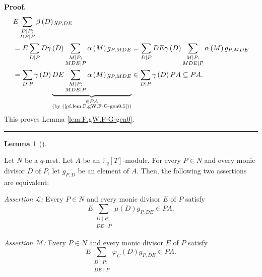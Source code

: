 \documentclass[numbers=enddot,12pt,final,onecolumn,notitlepage]{scrartcl}%
\theoremstyle{definition}
\newtheorem{lem}[theo]{Lemma}
\newenvironment{lemma}[1][]
{\begin{lem}[#1]\begin{leftbar}}
{\end{leftbar}\end{lem}}
\newenvironment{proof}[1][Proof]{\noindent\textbf{#1.} }{\ \rule{0.5em}{0.5em}}
\let\sumnonlimits\sum
\renewcommand{\sum}{\sumnonlimits\limits}
\begin{document}
\begin{proof}
\begin{align*}
&  E\sum_{\substack{D\mid P;\\DE\mid P}}\beta\left(  D\right)  g_{P,DE}\\
&  =E\sum_{D\mid P}D\gamma\left(  D\right)  \sum_{\substack{M\mid P;\\MDE\mid
P}}\alpha\left(  M\right)  g_{P,MDE}=\sum_{D\mid P}DE\gamma\left(  D\right)
\sum_{\substack{M\mid P;\\MDE\mid P}}\alpha\left(  M\right)  g_{P,MDE}\\
&  =\sum_{D\mid P}\gamma\left(  D\right)  \underbrace{DE\sum_{\substack{M\mid
P;\\MDE\mid P}}\alpha\left(  M\right)  g_{P,MDE}}_{\substack{\in PA\\\text{(by
(\ref{pf.lem.F.gW.F-G-gen0.5}))}}}\in\sum_{D\mid P}\gamma\left(  D\right)
PA\subseteq PA.
\end{align*}
This proves Lemma \ref{lem.F.gW.F-G-gen0}.
\end{proof}

\begin{lemma}
\label{lem.F.gW.F-G-gen}Let $N$ be a $q$-nest. Let $A$ be an $\mathbb{F}%
_{q}\left[  T\right]  $-module. For every $P\in N$ and every monic divisor $D$
of $P$, let $g_{P,D}$ be an element of $A$. Then, the following two assertions
are equivalent:

\textit{Assertion }$\mathcal{L}$\textit{:} Every $P\in N$ and every monic
divisor $E$ of $P$ satisfy%
\[
E\sum_{\substack{D\mid P;\\DE\mid P}}\mu\left(  D\right)  g_{P,DE}\in PA.
\]


\textit{Assertion }$\mathcal{M}$\textit{:} Every $P\in N$ and every monic
divisor $E$ of $P$ satisfy%
\[
E\sum_{\substack{D\mid P;\\DE\mid P}}\varphi_{C}\left(  D\right)  g_{P,DE}\in
PA.
\]

\end{lemma}
\end{document}
